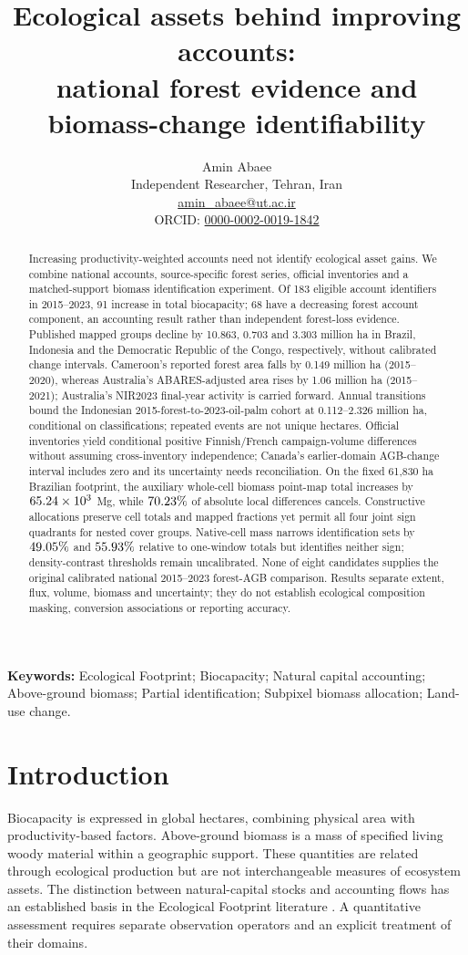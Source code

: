 \documentclass[11pt,a4paper]{article}
\title{Ecological assets behind improving accounts:\\national forest evidence and biomass-change identifiability}
\author{Amin Abaee\\\small Independent Researcher, Tehran, Iran\\\small\href{mailto:amin_abaee@ut.ac.ir}{amin\_abaee@ut.ac.ir}\\\small ORCID: \href{https://orcid.org/0000-0002-0019-1842}{0000-0002-0019-1842}}
\date{}
\begin{document}
\maketitle
\begin{abstract}
Increasing productivity-weighted accounts need not identify ecological asset gains. We combine national accounts, source-specific forest series, official inventories and a matched-support biomass identification experiment. Of 183 eligible account identifiers in 2015--2023, 91 increase in total biocapacity; 68 have a decreasing forest account component, an accounting result rather than independent forest-loss evidence. Published mapped groups decline by 10.863, 0.703 and 3.303 million ha in Brazil, Indonesia and the Democratic Republic of the Congo, respectively, without calibrated change intervals. Cameroon's reported forest area falls by 0.149 million ha (2015--2020), whereas Australia's ABARES-adjusted area rises by 1.06 million ha (2015--2021); Australia's NIR2023 final-year activity is carried forward. Annual transitions bound the Indonesian 2015-forest-to-2023-oil-palm cohort at 0.112--2.326 million ha, conditional on classifications; repeated events are not unique hectares. Official inventories yield conditional positive Finnish/French campaign-volume differences without assuming cross-inventory independence; Canada's earlier-domain AGB-change interval includes zero and its uncertainty needs reconciliation. On the fixed 61,830 ha Brazilian footprint, the auxiliary whole-cell biomass point-map total increases by $65.24\times10^3$ Mg, while $70.23\%$ of absolute local differences cancels. Constructive allocations preserve cell totals and mapped fractions yet permit all four joint sign quadrants for nested cover groups. Native-cell mass narrows identification sets by $49.05\%$ and $55.93\%$ relative to one-window totals but identifies neither sign; density-contrast thresholds remain uncalibrated. None of eight candidates supplies the original calibrated national 2015--2023 forest-AGB comparison. Results separate extent, flux, volume, biomass and uncertainty; they do not establish ecological composition masking, conversion associations or reporting accuracy.
\end{abstract}

\noindent\textbf{Keywords:} Ecological Footprint; Biocapacity; Natural capital accounting; Above-ground biomass; Partial identification; Subpixel biomass allocation; Land-use change.


\section{Introduction}
Biocapacity is expressed in global hectares, combining physical area with productivity-based factors. Above-ground biomass is a mass of specified living woody material within a geographic support. These quantities are related through ecological production but are not interchangeable measures of ecosystem assets. The distinction between natural-capital stocks and accounting flows has an established basis in the Ecological Footprint literature \citep{Mancini2017}. A quantitative assessment requires separate observation operators and an explicit treatment of their domains.
\end{document}

